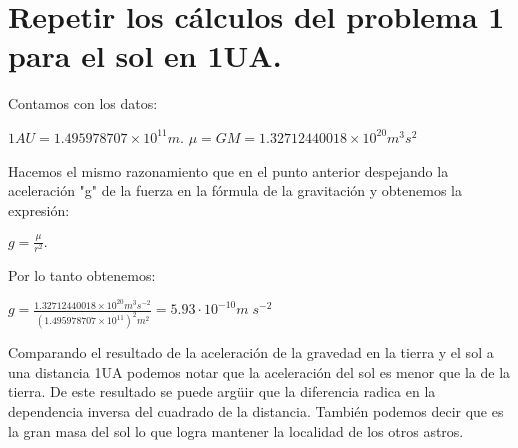 \documentclass[a4paper,12pt]{article}
\begin{document}
\section{Repetir los cálculos del problema 1 para el sol en 1UA.}
\vspace{\baselineskip}

\begin{justify}
    Contamos con los datos:
\end{justify}

    \(1AU = 1.495978707 \times 10^{11} m. \) \;\;\;\;\;\;\;\;  \(\mu  = GM  =  1.32712440018 \times 10^{20} m^3 s^{2} \)

\vspace{\baselineskip}

\begin{justify}
    Hacemos el mismo razonamiento que en el punto anterior despejando la aceleración "g" de la fuerza en la fórmula de la gravitación y obtenemos la expresión:
\end{justify}


\begin{center}
    \(g =\frac{\mu }{r^2}.\)
\end{center}

\vspace{\baselineskip}

\begin{justify}
    Por lo tanto obtenemos:
\end{justify}

\begin{center}
    \(g = \frac{1.32712440018 \times 10^{20} m^3 s^{-2}}{(1.495978707 \times 10^{11})^2 m^2} = 5.93 \cdot 10^{-10} m\;s^{-2}\)
\end{center}

\begin{justify}
    Comparando el resultado de la aceleración de la gravedad en la tierra y el sol a una distancia 1UA podemos notar que la
    aceleración del sol es menor que la de la tierra. De este resultado se puede argüir que la diferencia radica en la dependencia inversa
    del cuadrado de la distancia. También podemos decir que es la gran masa del sol lo que logra mantener la localidad de los otros astros.
\end{justify}

\vspace{\baselineskip}
\end{document}
